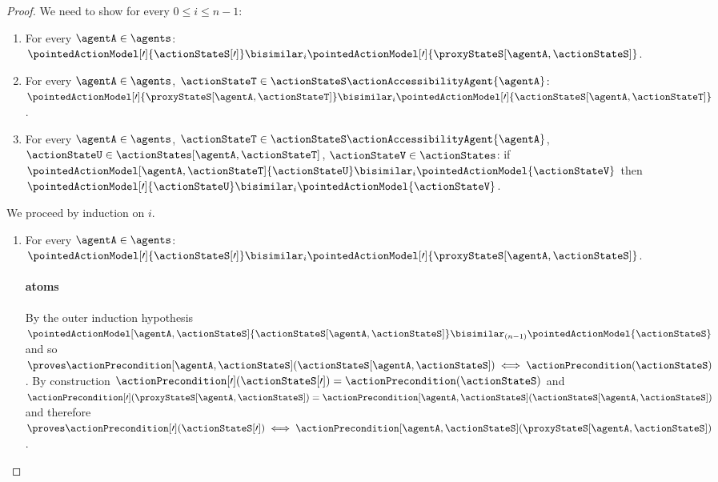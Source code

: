 \documentclass[twoside]{aiml14}
\begin{document}
\begin{proof}
      We need to show for every $0 \leq i \leq n - 1$: 
      \begin{enumerate}
          \item For every $\agentA \in \agents$: $\pointedActionModel[\prime]{\actionStateS[\prime]} \bisimilar_i \pointedActionModel[\prime]{\proxyStateS[\agentA,\actionStateS]}$.
          \item For every $\agentA \in \agents$, $\actionStateT \in \actionStateS \actionAccessibilityAgent{\agentA}$: $\pointedActionModel[\prime]{\proxyStateS[\agentA,\actionStateT]} \bisimilar_i \pointedActionModel[\prime]{\actionStateS[\agentA,\actionStateT]}$.
          \item For every $\agentA \in \agents$, $\actionStateT \in \actionStateS \actionAccessibilityAgent{\agentA}$, $\actionStateU \in \actionStates[\agentA,\actionStateT]$, $\actionStateV \in \actionStates$: if $\pointedActionModel[\agentA,\actionStateT]{\actionStateU} \bisimilar_i \pointedActionModel{\actionStateV}$ then $\pointedActionModel[\prime]{\actionStateU} \bisimilar_i \pointedActionModel{\actionStateV}$.
      \end{enumerate}

      We proceed by induction on $i$.

      \begin{enumerate}
          \item 
              For every $\agentA \in \agents$: $\pointedActionModel[\prime]{\actionStateS[\prime]} \bisimilar_i \pointedActionModel[\prime]{\proxyStateS[\agentA,\actionStateS]}$.

              \paragraph{atoms} By the outer induction hypothesis $\pointedActionModel[\agentA,\actionStateS]{\actionStateS[\agentA,\actionStateS]} \bisimilar_{(n - 1)} \pointedActionModel{\actionStateS}$
              and so $\proves \actionPrecondition[\agentA,\actionStateS](\actionStateS[\agentA,\actionStateS]) \iff \actionPrecondition(\actionStateS)$.
              By construction $\actionPrecondition[\prime](\actionStateS[\prime]) = \actionPrecondition(\actionStateS)$ 
              and $\actionPrecondition[\prime](\proxyStateS[\agentA,\actionStateS]) = \actionPrecondition[\agentA,\actionStateS](\actionStateS[\agentA,\actionStateS])$ 
              and therefore $\proves \actionPrecondition[\prime](\actionStateS[\prime]) \iff \actionPrecondition[\agentA,\actionStateS](\proxyStateS[\agentA,\actionStateS])$.


\end{enumerate}
\end{proof}
\end{document}
